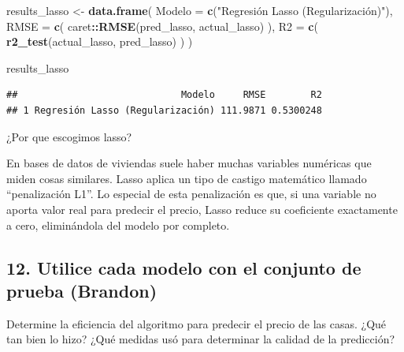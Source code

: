 \documentclass[
]{article}
\newenvironment{Shaded}{\begin{snugshade}}{\end{snugshade}}
\newcommand{\AttributeTok}[1]{\textcolor[rgb]{0.13,0.29,0.53}{#1}}
\newcommand{\FunctionTok}[1]{\textcolor[rgb]{0.13,0.29,0.53}{\textbf{#1}}}
\newcommand{\NormalTok}[1]{#1}
\newcommand{\OtherTok}[1]{\textcolor[rgb]{0.56,0.35,0.01}{#1}}
\newcommand{\SpecialCharTok}[1]{\textcolor[rgb]{0.81,0.36,0.00}{\textbf{#1}}}
\newcommand{\StringTok}[1]{\textcolor[rgb]{0.31,0.60,0.02}{#1}}
\begin{document}
\begin{Shaded}
\begin{Highlighting}[]
\NormalTok{results\_lasso }\OtherTok{\textless{}{-}} \FunctionTok{data.frame}\NormalTok{(}
  \AttributeTok{Modelo =} \FunctionTok{c}\NormalTok{(}\StringTok{"Regresión Lasso (Regularización)"}\NormalTok{),}
  \AttributeTok{RMSE =} \FunctionTok{c}\NormalTok{(}
\NormalTok{    caret}\SpecialCharTok{::}\FunctionTok{RMSE}\NormalTok{(pred\_lasso, actual\_lasso)}
\NormalTok{  ),}
  \AttributeTok{R2 =} \FunctionTok{c}\NormalTok{(}
    \FunctionTok{r2\_test}\NormalTok{(actual\_lasso, pred\_lasso)}
\NormalTok{  )}
\NormalTok{)}

\NormalTok{results\_lasso}
\end{Highlighting}
\end{Shaded}

\begin{verbatim}
##                             Modelo     RMSE        R2
## 1 Regresión Lasso (Regularización) 111.9871 0.5300248
\end{verbatim}

¿Por que escogimos lasso?

En bases de datos de viviendas suele haber muchas variables numéricas
que miden cosas similares. Lasso aplica un tipo de castigo matemático
llamado ``penalización L1''. Lo especial de esta penalización es que, si
una variable no aporta valor real para predecir el precio, Lasso reduce
su coeficiente exactamente a cero, eliminándola del modelo por completo.

\subsection{12. Utilice cada modelo con el conjunto de prueba
(Brandon)}\label{utilice-cada-modelo-con-el-conjunto-de-prueba-brandon}

Determine la eficiencia del algoritmo para predecir el precio de las
casas. ¿Qué tan bien lo hizo? ¿Qué medidas usó para determinar la
calidad de la predicción?
\end{document}
